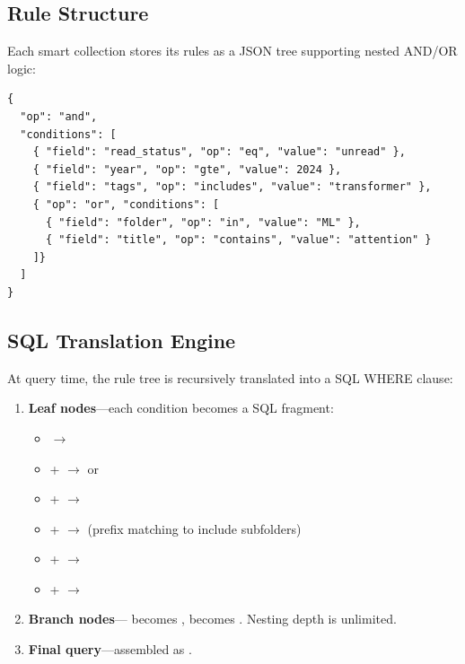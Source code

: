 \subsection{Rule Structure}

Each smart collection stores its rules as a JSON tree supporting nested AND/OR logic:

\begin{verbatim}
{
  "op": "and",
  "conditions": [
    { "field": "read_status", "op": "eq", "value": "unread" },
    { "field": "year", "op": "gte", "value": 2024 },
    { "field": "tags", "op": "includes", "value": "transformer" },
    { "op": "or", "conditions": [
      { "field": "folder", "op": "in", "value": "ML" },
      { "field": "title", "op": "contains", "value": "attention" }
    ]}
  ]
}
\end{verbatim}

\subsection{SQL Translation Engine}

At query time, the rule tree is recursively translated into a SQL WHERE clause:

\begin{enumerate}
  \item \textbf{Leaf nodes}---each condition becomes a SQL fragment:
    \begin{itemize}
      \item {} $\to$ 
      \item {} +  $\to$  or
      \item {} +  $\to$ 
      \item {} +  $\to$  (prefix matching to include subfolders)
      \item {} +  $\to$ 
      \item {} +  $\to$ 
    \end{itemize}
  \item \textbf{Branch nodes}--- becomes ,
     becomes . Nesting depth is unlimited.
  \item \textbf{Final query}---assembled as .
\end{enumerate}

